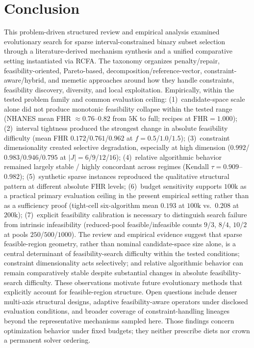 \documentclass[lettersize,journal]{IEEEtran}
\begin{document}
\section{Conclusion}
\label{sec:concl}
This problem-driven structured review and empirical analysis examined evolutionary search for sparse interval-constrained binary subset selection through a literature-derived mechanism synthesis and a unified comparative setting instantiated via RCFA.
The taxonomy organizes penalty/repair, feasibility-oriented, Pareto-based, decomposition/reference-vector, constraint-aware/hybrid, and memetic approaches around how they handle constraints, feasibility discovery, diversity, and local exploitation.
Empirically, within the tested problem family and common evaluation ceiling:
(1)~candidate-space scale alone did not produce monotonic feasibility collapse within the tested range (NHANES mean FHR $\approx 0.76$--$0.82$ from $5\mathrm{K}$ to full; recipes at $\mathrm{FHR}=1.000$);
(2)~interval tightness produced the strongest change in absolute feasibility difficulty (mean FHR $0.172$/$0.761$/$0.962$ at $f=0.5$/$1.0$/$1.5$);
(3)~constraint dimensionality created selective degradation, especially at high dimension ($0.992$/$0.983$/$0.946$/$0.795$ at $|J|=6$/$9$/$12$/$16$);
(4)~relative algorithmic behavior remained largely stable / highly concordant across regimes (Kendall $\tau=0.909$--$0.982$);
(5)~synthetic sparse instances reproduced the qualitative structural pattern at different absolute FHR levels;
(6)~budget sensitivity supports $100\mathrm{k}$ as a practical primary evaluation ceiling in the present empirical setting rather than as a sufficiency proof (tight-cell six-algorithm mean $0.193$ at $100\mathrm{k}$ vs.\ $0.208$ at $200\mathrm{k}$);
(7)~explicit feasibility calibration is necessary to distinguish search failure from intrinsic infeasibility (reduced-pool feasible/infeasible counts $9$/$3$, $8$/$4$, $10$/$2$ at pools $250$/$500$/$1000$).
The review and empirical evidence suggest that sparse feasible-region geometry, rather than nominal candidate-space size alone, is a central determinant of feasibility-search difficulty within the tested conditions; constraint dimensionality acts selectively; and relative algorithmic behavior can remain comparatively stable despite substantial changes in absolute feasibility-search difficulty.
These observations motivate future evolutionary methods that explicitly account for feasible-region structure.
Open questions include denser multi-axis structural designs, adaptive feasibility-aware operators under disclosed evaluation conditions, and broader coverage of constraint-handling lineages beyond the representative mechanisms sampled here.
Those findings concern optimization behavior under fixed budgets; they neither prescribe diets nor crown a permanent solver ordering.
\end{document}
